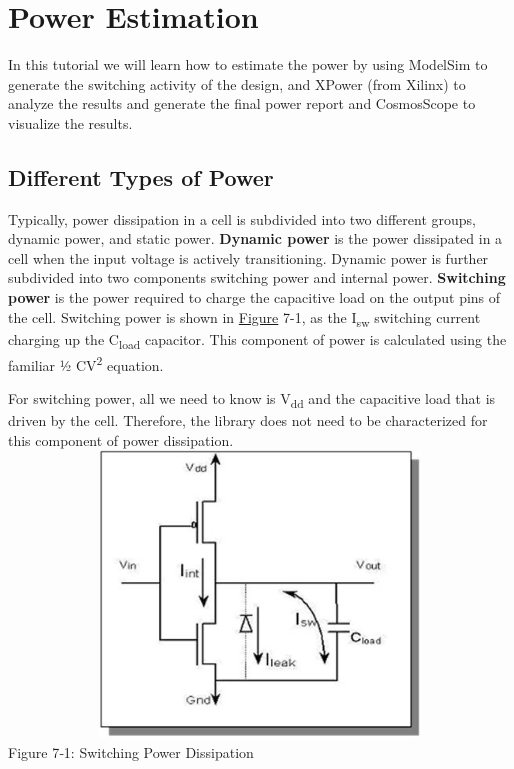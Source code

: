 \documentclass[
]{article}
\author{}
\date{}
\begin{document}
\hypertarget{power-estimation}{%
\section{Power Estimation}\label{power-estimation}}

In this tutorial we will learn how to estimate the power by using
ModelSim to generate the switching activity of the design, and XPower
(from Xilinx) to analyze the results and generate the final power report
and CosmosScope to visualize the results.

\hypertarget{different-types-of-power}{%
\subsection{Different Types of Power}\label{different-types-of-power}}

Typically, power dissipation in a cell is subdivided into two different
groups, dynamic power, and static power. \textbf{Dynamic power} is the
power dissipated in a cell when the input voltage is actively
transitioning. Dynamic power is further subdivided into two components
switching power and internal power. \textbf{Switching power} is the
power required to charge the capacitive load on the output pins of the
cell. Switching power is shown in \protect\hyperlink{Fig71}{Figure} 7-1,
as the I\textsubscript{sw} switching current charging up the
C\textsubscript{load} capacitor. This component of power is calculated
using the familiar ½ CV\textsuperscript{2} equation.

For switching power, all we need to know is V\textsubscript{dd} and the
capacitive load that is driven by the cell. Therefore, the library does
not need to be characterized for this component of power dissipation.
\includegraphics[width=6.28333in,height=3in]{7-1.png}
Figure 7‑1: Switching Power Dissipation
\end{document}
